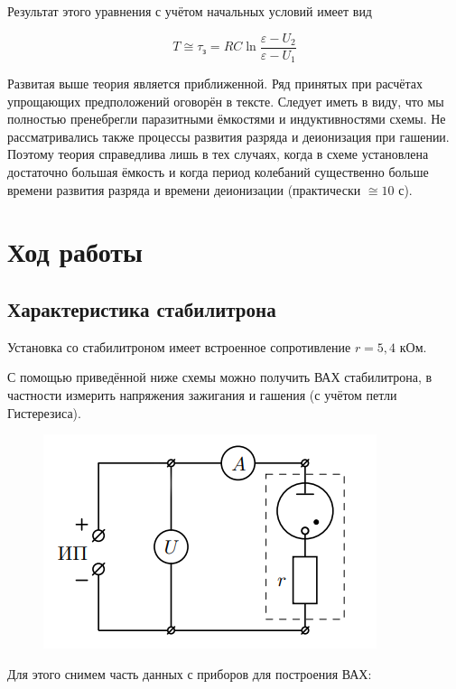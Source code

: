 Результат этого уравнения с учётом начальных условий имеет вид

\begin{equation}
    T \cong \tau_{\text{з}} = RC \ln{\frac{\varepsilon - U_2}{\varepsilon - U_1}}
\end{equation}

Развитая выше теория является приближенной. Ряд принятых при расчётах упрощающих предположений оговорён в тексте. Следует иметь в виду, что мы полностью пренебрегли паразитными ёмкостями и индуктивностями схемы. Не рассматривались также процессы развития разряда и деионизация при гашении. Поэтому теория справедлива лишь в тех случаях, когда в схеме установлена достаточно большая ёмкость и когда период колебаний существенно больше времени развития разряда и времени деионизации (практически $\cong 10$ с).

\section{Ход работы}
\subsection{Характеристика стабилитрона}

Установка со стабилитроном имеет встроенное сопротивление $r = 5,4$ кОм.

С помощью приведённой ниже схемы можно получить ВАХ стабилитрона, в частности измерить напряжения зажигания и гашения (с учётом петли Гистерезиса).

\begin{figure}[h!]
    \centering
    \includegraphics[width = 8 cm]{images/3.png}
    \caption{}
    \label{}
\end{figure}

Для этого снимем часть данных с приборов для построения ВАХ:

